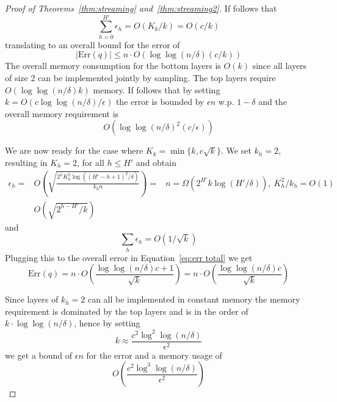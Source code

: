 \documentclass[anon,12pt]{colt2019} %
\newcommand{\eps}{\epsilon}
\newcommand{\komconstant}{c}
\begin{document}
\begin{proof} [Proof of Theorems~\ref{thm:streaming} and~\ref{thm:streaming2}]
If follows that 
$$ \sum_{h=0}^{H'} \eps_h = O(K_k/k) = O(\komconstant/k) $$
translating to an overall bound for the error of
$$ |\text{Err}(q)| \leq n \cdot O\left( \log \log(n/\delta)(\komconstant/k)  \right)$$
The overall memory consumption for the bottom layers is $O(k)$ since all layers of size 2 can be implemented jointly by sampling. The top layers require $O(\log\log(n/\delta)k)$ memory. If follows that by setting $k= O\left(\komconstant \log\log(n/\delta) / \eps\right)$ the error is bounded by $\eps n$ w.p. $1-\delta$ and the overall memory requirement is 
$$ O\left( \log \log(n/\delta)^2 (\komconstant/\eps)  \right) $$


We are now ready for the case where $K_k = \min\{k, \komconstant\sqrt{k}\}$. We set $k_h=2$, resulting in $K_h=2$, for all $h \leq H'$ and obtain
\begin{align*}
\eps_h = & O\left( \sqrt{\frac{2^h K_h^2 \log((H'-h+1)^2/\delta)}{k_h n}} \right) = & n=\Omega(2^{H'}k\log(H'/\delta)), \ K_h^2/k_h=O(1) \\
  	   &  O\left( \sqrt{2^{h-H'}/k} \right) 
\end{align*}
and 
$$ \sum_h \eps_h = O\left(1/\sqrt{k}\right) $$
Plugging this to the overall error in Equation~\eqref{eq:err total} we get
$$ \text{Err}(q) = n \cdot O\left( \frac{\log \log(n/\delta)\komconstant + 1}{\sqrt{k}}  \right) =  n \cdot O\left( \frac{\log \log(n/\delta)\komconstant }{\sqrt{k}}  \right) $$

Since layers of $k_h=2$ can all be implemented in constant memory the memory requirement is dominated by the top layers and is in the order of $k \cdot \log\log(n/\delta)$, hence by setting 
$$k \approx \frac{\komconstant^2 \log^2\log(n/\delta)}{\eps^2}$$ 
we get a bound of $\eps n$ for the error and a memory usage of 
$$ O\left( \frac{\komconstant^2 \log^3\log(n/\delta)}{\eps^2}\right) $$
\end{proof}
\end{document}
